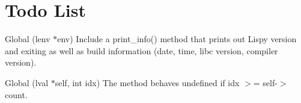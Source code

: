 \chapter{Todo List}
\hypertarget{todo}{}\label{todo}

\begin{DoxyRefList}
\item[Global \doxylink{main_8c_ae0bc1b95ea825d6afef0872fa8e5b28a}{cli\+\_\+interpreter} (lenv \texorpdfstring{$\ast$}{*}env)]\label{todo__todo000002}%
%
Include a print\+\_\+info() method that prints out Lispy version and exiting as well as build information (date, time, libc version, compiler version). 
\item[Global \doxylink{common_8h_acce4599097304ad62eea4f1b63e0fa00}{lval\+\_\+pop} (lval \texorpdfstring{$\ast$}{*}self, int idx)]\label{todo__todo000001}%
%
The method behaves undefined if idx \texorpdfstring{$>$}{>}= self-\/\texorpdfstring{$>$}{>}count.
\end{DoxyRefList}
